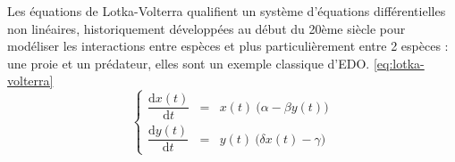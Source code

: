 \documentclass{wsdcr}
\begin{document}
Les équations de Lotka-Volterra qualifient un système d'équations différentielles non linéaires, historiquement développées au début du 20ème siècle pour modéliser les interactions entre espèces et plus particulièrement entre 2 espèces : une proie et un prédateur, elles sont un exemple classique d'EDO. \ref{eq:lotka-volterra} \cite{lotka1920}
\begin{equation}
\left\{
{\begin{array}{ccc}{\dfrac {\mathrm {d} x(t)}{\mathrm {d} t}}&=&x(t)\ {\Big (}\alpha -\beta y(t){\Big )}\\{\dfrac {\mathrm {d} y(t)}{\mathrm {d} t}}&=&y(t)\ {\Big (}\delta x(t)-\gamma {\Big )}\end{array}}
\right.
\label{eq:lotka-volterra}
\end{equation}
\begin{figure}[b!]
\end{figure}
\end{document}
